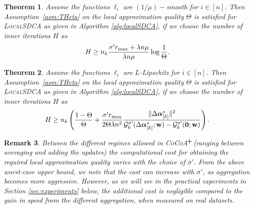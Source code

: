 \documentclass{article}
\newcommand{\cocoa}{\textsc{CoCoA}\xspace}
\newcommand{\cocoap}{\textsc{CoCoA$\!^{\bf \textbf{\footnotesize+}}$}\xspace}
\newcommand{\localSDCA}{\textsc{LocalSDCA}\xspace}
\newcommand{\R}{\mathbb{R}}                      %
\newcommand{\wv}{ {\bf w}}
\newcommand{\alphav}{ {\boldsymbol \alpha}}
\newcommand{\0}{ {\bf 0}}
\newcommand{\vsubset}[2]{#1_{[#2]}}
\newcommand{\vc}[2]{#1^{(#2)}}                   %
\newcommand{\Ggk}{\mathcal{G}^{\sigma'}_k\hspace{-0.08em}}
\theoremstyle{plain}
\newtheorem{theorem}{Theorem}
\newtheorem{remark}[theorem]{Remark}
\theoremstyle{definition}
\begin{document}
{\begin{theorem}
\label{thm:LocalSDCA_smooth2}
Assume the functions $\ell_i$ are $(1/\mu)-$smooth for $i\in[n]$.
Then Assumption~\ref{asm:THeta} on the  local approximation quality $\Theta$ is satisfied
for \localSDCA as given in Algorithm \ref{alg:localSDCA}, if we
choose the number of inner iterations $H$ as \vspace{-1mm}
\begin{equation}
\label{eq:asjfwjfdwafcea}
H \geq n_k \frac{\sigma' r_{\max} + \lambda n \mu}{\lambda n \mu} \log \frac1{\Theta} . \vspace{-1mm}
\end{equation}
\end{theorem}
 

\begin{theorem}
\label{thm:LocalSDCA_smooth1}
Assume the functions $\ell_i$ are $L$-Lipschitz for $i\in[n]$.
Then Assumption~\ref{asm:THeta} on the local approximation quality $\Theta$ is satisfied
for \localSDCA as given in Algorithm \ref{alg:localSDCA}, if we
choose the number of inner iterations $H$ as  \vspace{-1mm}
\begin{equation}
\label{eq:H_convexLoss}
H \geq   n_k   
 \left( 
\frac{1-\Theta}{\Theta  } 
  +
  \frac{\sigma'r_{\max}}
       {2\Theta \lambda n^2}        
\frac{\| \vsubset{\Delta \alphav^*}{k}\|^2}
{  \Ggk( 
   \vsubset{\Delta \alphav^*}{k}; \wv)
-   \Ggk( {\bf 0}; \wv)}
 \right) .
\end{equation}
\end{theorem}

\iffalse
\begin{theorem}
\label{thm:LocalSDCA_smoothShai}
TODO
\todo[inline]{
one more theorem where $H$ doesn't depend on $\vsubset{\Delta \alphav^*}{k}$
}
\end{theorem}
\fi


\begin{remark}
Between the different regimes allowed in \cocoap (ranging between averaging and adding the updates) the computational cost for obtaining the required local approximation quality varies with the choice of $\sigma'$.
From the above worst-case upper bound, we note that the cost can increase with $\sigma'$, as aggregation becomes more aggressive. %
However, as we will see in the practical experiments in Section \ref{sec:experiments} below, the additional cost is negligible compared to the gain in speed from the different aggregation, when measured on real datasets.
\end{remark}




}
\end{document}
